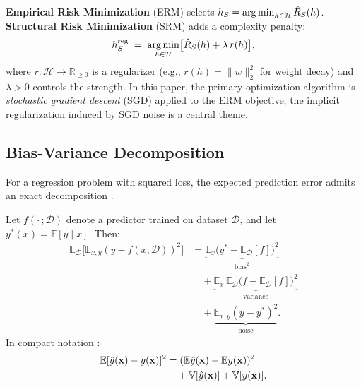 \documentclass[
  journal=largetwo,
  simfonts=false,
  year=2025,
  volume=37,
]{cup-journal}
\begin{document}
\begin{definition}\label{def:erm_srm}
\textbf{Empirical Risk Minimization} (ERM) selects $h_S = \operatorname*{arg\,min}_{h\in\mathcal{H}}\hat{R}_S(h)$.
\textbf{Structural Risk Minimization} (SRM) adds a complexity penalty:
\begin{equation}\label{eq:srm}
    h_S^{\mathrm{reg}} \;=\; \operatorname*{arg\,min}_{h\in\mathcal{H}}\bigl[\hat{R}_S(h)+\lambda\, r(h)\bigr],
\end{equation}
where $r:\mathcal{H}\to\mathbb{R}_{\geq 0}$ is a regularizer (e.g., $r(h)=\|w\|_2^2$ for weight decay) and $\lambda>0$ controls the strength. In this paper, the primary optimization algorithm is \textit{stochastic gradient descent} (SGD) applied to the ERM objective; the implicit regularization induced by SGD noise is a central theme.
\end{definition}

\subsection{Bias-Variance Decomposition}

For a regression problem with squared loss, the expected prediction error admits an exact decomposition \cite{6797087}.

\begin{theorem}\label{thm:bv_decomp}
Let $f(\cdot\,;\mathcal{D})$ denote a predictor trained on dataset $\mathcal{D}$, and let $y^{*}(x)=\mathbb{E}[y\mid x]$. Then:
\begin{equation}\label{eq:bv_decomp}
\begin{aligned}
    \mathbb{E}_{\mathcal{D}}\!\bigl[\mathbb{E}_{x,y}(y-f(x;\mathcal{D}))^2\bigr]
    &= \underbrace{\mathbb{E}_x\bigl(y^*\!-\mathbb{E}_{\mathcal{D}}[f]\bigr)^{2}}_{\text{bias}^2} \\
    &\quad + \underbrace{\mathbb{E}_x\,\mathbb{E}_{\mathcal{D}}\bigl(f-\mathbb{E}_{\mathcal{D}}[f]\bigr)^{2}}_{\text{variance}} \\
    &\quad + \underbrace{\mathbb{E}_{x,y}(y-y^*)^2}_{\text{noise}}.
\end{aligned}
\end{equation}
In compact notation \cite{adlam2020understandingdoubledescentrequires}:
\begin{equation*}
\begin{aligned}
\mathbb{E}[\hat{y}(\mathbf{x})-y(\mathbf{x})]^2
&= (\mathbb{E}\hat{y}(\mathbf{x})-\mathbb{E} y(\mathbf{x}))^2 \\
&\quad + \mathbb{V}[\hat{y}(\mathbf{x})] + \mathbb{V}[y(\mathbf{x})].
\end{aligned}
\end{equation*}
\end{theorem}
\end{document}
